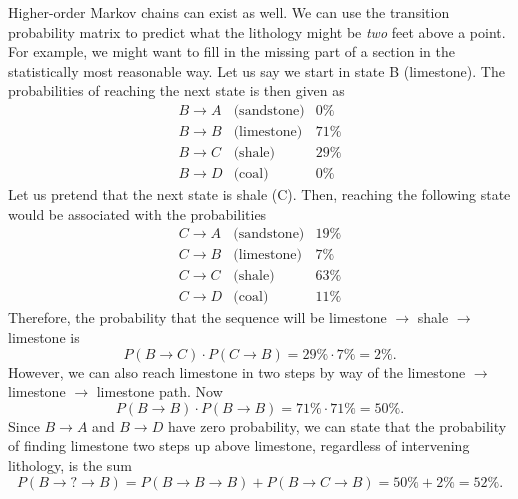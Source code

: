 Higher-order Markov chains can exist as well. We can use the transition probability matrix to predict what the lithology might be \emph{two} feet 
above a point.  For example, we might want to fill in the missing part of a section in the 
statistically most reasonable way.  Let us say we start in state B (limestone).  The probabilities of 
reaching the next state is then given as 
\begin{equation}
\begin{array}{clr}
B \rightarrow A & \mbox{(sandstone)}	& 	0\%  \\
B \rightarrow B & \mbox{(limestone)}	&	71\% \\
B \rightarrow C & \mbox{(shale)}	&	29\% \\
B \rightarrow D & \mbox{(coal)}		& 	0\%
\end{array}
\end{equation}
Let us pretend that the next state is shale (C). Then, reaching the following state would be associated with the probabilities
\begin{equation}
\begin{array}{llr}
C \rightarrow A & \mbox{(sandstone)}	& 	19\% \\
C \rightarrow B & \mbox{(limestone)}	& 	7\%  \\
C \rightarrow C & \mbox{(shale)}	& 	63\% \\
C \rightarrow D & \mbox{(coal)}		& 	11\%
\end{array}
\end{equation}
Therefore, the probability that the sequence will be limestone $\rightarrow$ shale $\rightarrow$ limestone is 
\begin{equation}
P(B \rightarrow C) \cdot P (C \rightarrow B) = 29\% \cdot 7\% = 2\%.
\end{equation}
However, we can also reach limestone in two steps by way of the limestone $\rightarrow$ limestone $\rightarrow$
limestone path.  Now
\begin{equation}
P (B \rightarrow B) \cdot P (B \rightarrow B) = 71\% \cdot 71\% = 50\%.
\end{equation}
Since $B \rightarrow
A$  and $B\rightarrow D$ have zero probability, we can state that the probability of finding 
limestone two steps up above limestone, regardless of intervening lithology, is the sum 
\begin{equation}
P(B \rightarrow ? \rightarrow B) = P(B \rightarrow B \rightarrow B) + P(B \rightarrow C \rightarrow B) = 50\% + 2\% = 52\%.
\end{equation}
